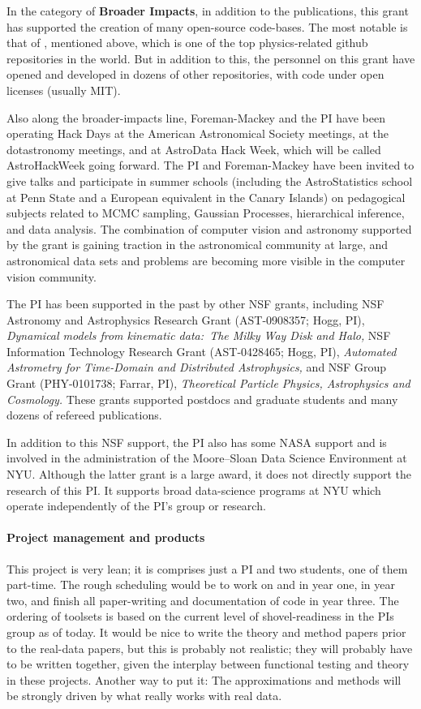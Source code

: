 \documentclass[12pt]{article}
\begin{document}
In the category of \textbf{Broader Impacts},
in addition to the publications, this grant has supported the creation of
many open-source code-bases.
The most notable is that of , mentioned above, which is
one of the top physics-related github repositories in the world.
But in addition to this, the personnel on this grant have opened and
developed in dozens of other repositories, with code under open
licenses (usually MIT).

Also along the broader-impacts line, Foreman-Mackey and the PI have
been operating Hack Days at the American Astronomical Society
meetings, at the dotastronomy meetings, and at AstroData Hack Week,
which will be called AstroHackWeek going forward.
The PI and Foreman-Mackey have been invited to give talks and
participate in summer schools (including the AstroStatistics school at
Penn State and a European equivalent in the Canary Islands) on
pedagogical subjects related to MCMC sampling, Gaussian Processes,
hierarchical inference, and data analysis.
The combination of computer vision and astronomy supported by the
grant is gaining traction in the astronomical community at large, and
astronomical data sets and problems are becoming more visible in the
computer vision community.

The PI has been supported in the past by other NSF grants, including
NSF Astronomy and Astrophysics Research Grant (AST-0908357; Hogg, PI),
\textit{Dynamical models from kinematic data:\ The Milky Way Disk and Halo,}
NSF Information Technology Research Grant (AST-0428465; Hogg, PI),
\textit{Automated Astrometry for Time-Domain and Distributed
Astrophysics,} and
NSF Group Grant (PHY-0101738; Farrar, PI), \textit{Theoretical
Particle Physics, Astrophysics and Cosmology.}
These grants supported postdocs and graduate students and many dozens
of refereed publications.

In addition to this NSF support, the PI also has some NASA support and
is involved in the administration of the Moore--Sloan Data Science
Environment at NYU.
Although the latter grant is a large award, it does not directly
support the research of this PI.
It supports broad data-science programs at NYU which operate
independently of the PI's group or research.

\paragraph{Project management and products}

This project is very lean; it is comprises just a PI and two
students, one of them part-time.
The rough scheduling would be to work on  and
 in year one,  in year two, and
finish all paper-writing and documentation of code in year three.
The ordering of toolsets is based on the current level of shovel-readiness
in the PIs group as of today.
It would be nice to write the theory and method papers prior to the
real-data papers, but this is probably not realistic; they will
probably have to be written together, given the interplay between
functional testing and theory in these projects.
Another way to put it: The approximations and methods will be strongly
driven by what really works with real data.
\end{document}
